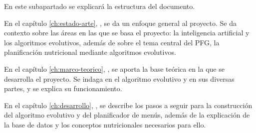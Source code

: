 En este subapartado se explicará la estructura del documento.

En el capítulo \ref{ch:estado-arte}, , se da un enfoque general al proyecto. Se da contexto sobre las áreas en las que se basa el proyecto: la inteligencia artificial y los algoritmos evolutivos, además de sobre el tema central del PFG, la planificación nutricional mediante algoritmos evolutivos.

En el capítulo \ref{ch:marco-teorico}, , se aporta la base teórica en la que se desarrolla el proyecto. Se indaga en el algoritmo evolutivo y en sus diversas partes, y se explica su funcionamiento.

En el capítulo \ref{ch:desarrollo}, , se describe los pasos a seguir para la construcción del algoritmo evolutivo y del planificador de menús, además de la explicación de la base de datos y los conceptos nutricionales necesarios para ello.